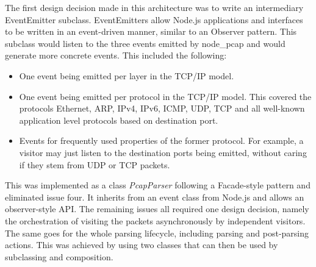 The first design decision made in this architecture was to write an intermediary EventEmitter subclass. EventEmitters allow Node.js applications and interfaces to be written in an event-driven manner, similar to an Observer pattern. This subclass would listen to the three events emitted by node\_pcap and would generate more concrete events. This included the following:
\begin{itemize}
    \item One event being emitted per layer in the TCP/IP model.
    \item One event being emitted per protocol in the TCP/IP model. This covered the protocols Ethernet, ARP, IPv4, IPv6, ICMP, UDP, TCP and all well-known application level protocols based on destination port.
    \item Events for frequently used properties of the former protocol. For example, a visitor may just listen to the destination ports being emitted, without caring if they stem from UDP or TCP packets.
\end{itemize}{}
This was implemented as a class \textit{PcapParser} following a Facade-style pattern and eliminated issue four. It inherits from an event class from Node.js and allows an observer-style API. The remaining issues all required one design decision, namely the orchestration of visiting the packets asynchronously by independent visitors. The same goes for the whole parsing lifecycle, including parsing and post-parsing actions. This was achieved by using two classes that can then be used by subclassing and composition.

